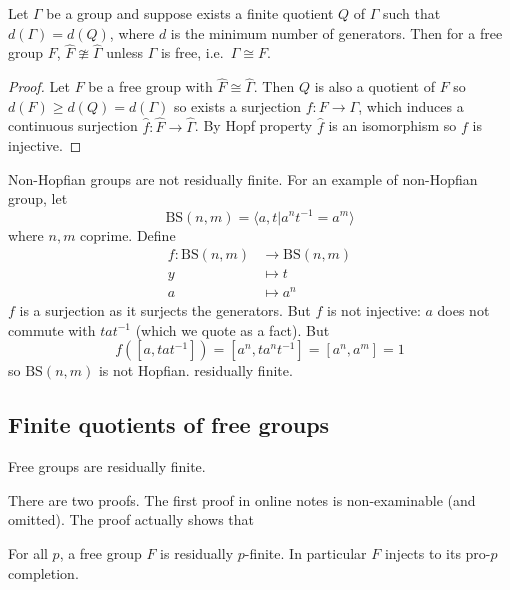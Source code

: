 \documentclass[a4paper]{article}
\begin{document}
\begin{proposition}
  Let \(\Gamma\) be a group and suppose exists a finite quotient \(Q\) of \(\Gamma\) such that \(d(\Gamma) = d(Q)\), where \(d\) is the minimum number of generators. Then for a free group \(F\), \(\hat F \ncong \hat \Gamma\) unless \(\Gamma\) is free, i.e.\ \(\Gamma \cong F\).
\end{proposition}

\begin{proof}
  Let \(F\) be a free group with \(\hat F \cong \hat \Gamma\). Then \(Q\) is also a quotient of \(F\) so \(d(F) \geq d(Q) = d(\Gamma)\) so exists a surjection \(f: F \to \Gamma\), which induces a continuous surjection \(\hat f: \hat F \to \hat \Gamma\). By Hopf property \(\hat f\) is an isomorphism so \(f\) is injective.
\end{proof}

\begin{eg}
  Non-Hopfian groups are not residually finite. For an example of non-Hopfian group, let
  \[
    \mathrm{BS}(n, m) = \langle a, t|a^nt^{-1} = a^m \rangle
  \]
  where \(n, m\) coprime. Define
  \begin{align*}
    f: \mathrm{BS}(n, m) &\to \mathrm{BS}(n, m) \\
    y &\mapsto t \\
    a &\mapsto a^n
  \end{align*}
  \(f\) is a surjection as it surjects the generators. But \(f\) is not injective: \(a\) does not commute with \(tat^{-1}\) (which we quote as a fact). But
  \[
    f([a, tat^{-1}]) = [a^n, ta^nt^{-1}] = [a^n, a^m] = 1
  \]
  so \(\mathrm{BS}(n, m)\) is not Hopfian. residually finite.
\end{eg}

\subsection{Finite quotients of free groups}

\begin{theorem}
  Free groups are residually finite.
\end{theorem}

There are two proofs. The first proof in online notes is non-examinable (and omitted). The proof actually shows that

\begin{corollary}
  For all \(p\), a free group \(F\) is residually \(p\)-finite. In particular \(F\) injects to its pro-\(p\) completion.
\end{corollary}
\end{document}
